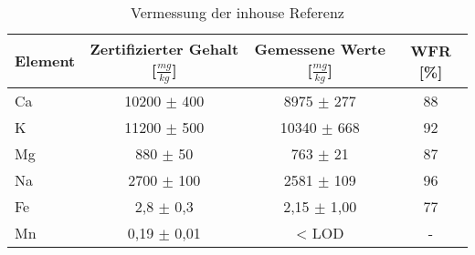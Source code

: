 \begin{table}[htbp]
  \centering
  \caption{Vermessung der inhouse Referenz}
    \begin{tabular}{lccc}
    \toprule
    Element & \makecell{Zertifizierter \\ Gehalt [$\frac{mg}{kg}$]}  & \makecell{Gemessene \\ Werte [$\frac{mg}{kg}$]} & WFR [\%] \\
    \midrule
    Ca    & 10200 $\pm$ 400   & 8975 $\pm$ 277 & 88 \\
    K     & 11200 $\pm$ 500   & 10340 $\pm$ 668 & 92 \\
    Mg    & 880   $\pm$ 50    & 763 $\pm$ 21 & 87 \\
    Na    & 2700  $\pm$ 100   & 2581 $\pm$ 109 & 96 \\
    Fe    & 2,8   $\pm$ 0,3   & 2,15 $\pm$ 1,00 & 77 \\
    Mn    & 0,19  $\pm$ 0,01  & < LOD      & - \\
    \bottomrule
    \end{tabular}%
  \label{tab:refAnalyse}%
\end{table}%
